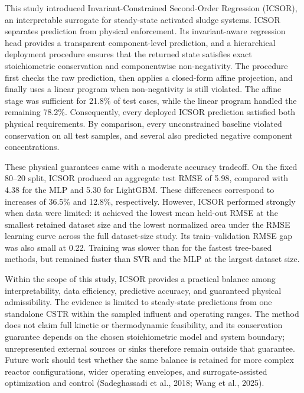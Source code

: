 \documentclass[a4paper,fleqn]{cas-sc}
\newenvironment{currentrevblock}{\begingroup\color{currentRevisionBlue}}{\endgroup}
\newenvironment{currentrevblock}{}{}
\newenvironment{revblock}{}{}
\begin{document}
\begin{revblock}

\begin{currentrevblock}
This study introduced Invariant-Constrained Second-Order Regression (ICSOR), an interpretable surrogate for steady-state activated sludge systems. ICSOR separates prediction from physical enforcement. Its invariant-aware regression head provides a transparent component-level prediction, and a hierarchical deployment procedure ensures that the returned state satisfies exact stoichiometric conservation and componentwise non-negativity. The procedure first checks the raw prediction, then applies a closed-form affine projection, and finally uses a linear program when non-negativity is still violated. The affine stage was sufficient for 21.8\% of test cases, while the linear program handled the remaining 78.2\%. Consequently, every deployed ICSOR prediction satisfied both physical requirements. By comparison, every unconstrained baseline violated conservation on all test samples, and several also predicted negative component concentrations.
\end{currentrevblock}

\begin{currentrevblock}
These physical guarantees came with a moderate accuracy tradeoff. On the fixed 80--20 split, ICSOR produced an aggregate test RMSE of 5.98, compared with 4.38 for the MLP and 5.30 for LightGBM. These differences correspond to increases of 36.5\% and 12.8\%, respectively. However, ICSOR performed strongly when data were limited: it achieved the lowest mean held-out RMSE at the smallest retained dataset size and the lowest normalized area under the RMSE learning curve across the full dataset-size study. Its train--validation RMSE gap was also small at 0.22. Training was slower than for the fastest tree-based methods, but remained faster than SVR and the MLP at the largest dataset size.
\end{currentrevblock}

\begin{currentrevblock}
Within the scope of this study, ICSOR provides a practical balance among interpretability, data efficiency, predictive accuracy, and guaranteed physical admissibility. The evidence is limited to steady-state predictions from one standalone CSTR within the sampled influent and operating ranges. The method does not claim full kinetic or thermodynamic feasibility, and its conservation guarantee depends on the chosen stoichiometric model and system boundary; unrepresented external sources or sinks therefore remain outside that guarantee. Future work should test whether the same balance is retained for more complex reactor configurations, wider operating envelopes, and surrogate-assisted optimization and control (Sadeghassadi et al., 2018; Wang et al., 2025).
\end{currentrevblock}
\end{revblock}
\end{document}
